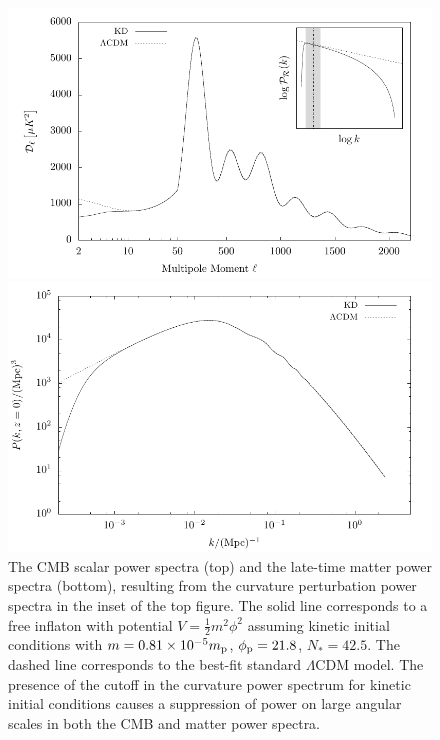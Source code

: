 \begin{figure}[tp]
  \centerline{\includegraphics[width=\textwidth]{chapters/kinetic_dominance/figures/Cl}}
  \centerline{\includegraphics[width=\textwidth]{chapters/kinetic_dominance/figures/matter}}
  \caption{The CMB scalar power spectra (top) and the late-time matter power spectra (bottom), resulting from the curvature perturbation power spectra in the inset of the top figure. The solid line corresponds to a free inflaton with potential \(V=\frac{1}{2}m^2\phi^2\) assuming kinetic initial conditions with \(m=0.81\times10^{-5}m_{\mathrm{p}}\), \(\phi_{\mathrm{p}} = 21.8\), \(N_*=42.5\). The dashed line corresponds to the best-fit standard \(\Lambda\)CDM model.  The presence of the cutoff in the curvature power spectrum for kinetic initial conditions causes a suppression of power on large angular scales in both the CMB and matter power spectra.}\label{fig:figure_Cl}
\end{figure}

